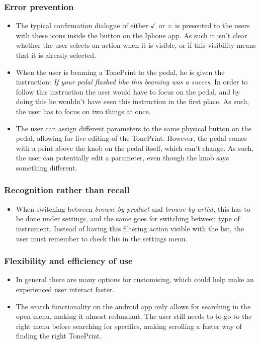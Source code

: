 \subsubsection{Error prevention}
\begin{itemize}
	\item The typical confirmation dialogue of either \textcolor{xGreen}{\textbf{$\checkmark$}} or \textcolor{xRed}{\textbf{$\times$}} is presented to the users with these icons inside the button on the Iphone app. As such it isn’t clear whether the user selects an action when it is visible, or if this visibility means that it is already selected.\\
	\item When the user is beaming a TonePrint to the pedal, he is given the instruction: \textit{If your pedal flashed like this beaming was a succes}. In order to follow this instruction the user would have to focus on the pedal, and by doing this he wouldn't have seen this instruction in the first place. As such, the user has to focus on two things at once.\\
	\item The user can assign different parameters to the same physical button on the pedal, allowing for live editing of the TonePrint. However, the pedal comes with a print above the knob on the pedal itself, which can't change. As such, the user can potentially edit a parameter, even though the knob says something different.
\end{itemize}
%
\subsubsection{Recognition rather than recall}
\begin{itemize}
	\item When switching between \textit{browse by product} and \textit{browse by artist}, this has to be done under settings, and the same goes for switching between type of instrument. Instead of having this filtering action visible with the list, the user must remember to check this in the settings menu. 
\end{itemize}
%
\subsubsection{Flexibility and efficiency of use}
\begin{itemize}
	\item In general there are many options for customising, which could help make an  experienced user interact faster.\\
	\item The search functionality on the android app only allows for searching in the open menu, making it almost redundant. The user still needs to to go to the right menu before searching for specifics, making scrolling a faster way of finding the right TonePrint.
\end{itemize}
%
